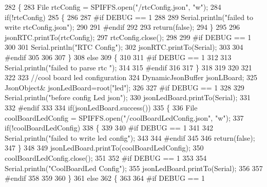 \begin{DoxyCode}
282     \{
283         File rtcConfig = SPIFFS.open(\textcolor{stringliteral}{"/rtcConfig.json"}, \textcolor{stringliteral}{"w"});   
284         \textcolor{keywordflow}{if}(!rtcConfig)
285         \{
286         
287 \textcolor{preprocessor}{        #if DEBUG == 1 }
288 
289             Serial.println(\textcolor{stringliteral}{"failed to write rtcConfig.json"});
290 
291 \textcolor{preprocessor}{        #endif}
292 
293             \textcolor{keywordflow}{return}(\textcolor{keyword}{false});
294         \}
295 
296         jsonRTC.printTo(rtcConfig);
297         rtcConfig.close();
298 
299 \textcolor{preprocessor}{    #if DEBUG == 1 }
300 
301         Serial.println(\textcolor{stringliteral}{"RTC Config"});
302         jsonRTC.printTo(Serial);
303     
304 \textcolor{preprocessor}{    #endif}
305 
306     
307     \}
308     \textcolor{keywordflow}{else}
309     \{
310     
311 \textcolor{preprocessor}{    #if DEBUG == 1 }
312 
313         Serial.println(\textcolor{stringliteral}{"failed to parse rtc "});
314     
315 \textcolor{preprocessor}{    #endif}
316 
317     \}
318 
319     
320     
321     
322     
323         \textcolor{comment}{//cool board led configuration}
324     DynamicJsonBuffer jsonLBoard;
325         JsonObject& jsonLedBoard=root[\textcolor{stringliteral}{"led"}];
326     
327 \textcolor{preprocessor}{#if DEBUG == 1 }
328 
329     Serial.println(\textcolor{stringliteral}{"before config Led json"});
330     jsonLedBoard.printTo(Serial);
331 
332 \textcolor{preprocessor}{#endif}
333 
334     \textcolor{keywordflow}{if}(jsonLedBoard.success())
335     \{   
336         File coolBoardLedConfig = SPIFFS.open(\textcolor{stringliteral}{"/coolBoardLedConfig.json"}, \textcolor{stringliteral}{"w"}); 
337         \textcolor{keywordflow}{if}(!coolBoardLedConfig)
338         \{
339         
340 \textcolor{preprocessor}{        #if DEBUG == 1 }
341         
342             Serial.println(\textcolor{stringliteral}{"failed to write led config"});
343         
344 \textcolor{preprocessor}{        #endif}
345 
346             \textcolor{keywordflow}{return}(\textcolor{keyword}{false});
347         \}
348         
349         jsonLedBoard.printTo(coolBoardLedConfig);
350         coolBoardLedConfig.close();
351 
352 \textcolor{preprocessor}{    #if DEBUG == 1 }
353 
354         Serial.println(\textcolor{stringliteral}{"CoolBoardLed Config"});      
355         jsonLedBoard.printTo(Serial);
356     
357 \textcolor{preprocessor}{    #endif}
358 
359     
360     \}
361     \textcolor{keywordflow}{else}
362     \{
363     
364 \textcolor{preprocessor}{    #if DEBUG == 1 }

\end{DoxyCode}
